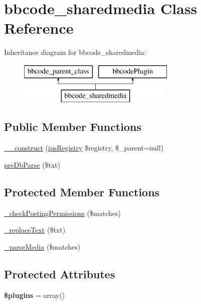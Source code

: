 \hypertarget{classbbcode__sharedmedia}{\section{bbcode\-\_\-sharedmedia Class Reference}
\label{classbbcode__sharedmedia}
}
Inheritance diagram for bbcode\-\_\-sharedmedia\-:\begin{figure}[H]
\begin{center}
\leavevmode
\includegraphics[height=2.000000cm]{classbbcode__sharedmedia}
\end{center}
\end{figure}
\subsection*{Public Member Functions}
\begin{DoxyCompactItemize}
\item 
\hyperlink{classbbcode__sharedmedia_a9c7a683aed4631ab88876012e950f1ab}{\-\_\-\-\_\-construct} (\hyperlink{classips_registry}{ips\-Registry} \$registry, \$\-\_\-parent=null)
\item 
\hyperlink{classbbcode__sharedmedia_a761782abec1999eac70cda803a5e0e32}{pre\-Db\-Parse} (\$txt)
\end{DoxyCompactItemize}
\subsection*{Protected Member Functions}
\begin{DoxyCompactItemize}
\item 
\hyperlink{classbbcode__sharedmedia_a5faf66ad7cadae84b2e772b6b07c883d}{\-\_\-check\-Posting\-Permissions} (\$matches)
\item 
\hyperlink{classbbcode__sharedmedia_a5001c42193db0c30308d9a3f17ccd950}{\-\_\-replace\-Text} (\$txt)
\item 
\hyperlink{classbbcode__sharedmedia_a561f790f0b1a5df646df9a3916215711}{\-\_\-parse\-Media} (\$matches)
\end{DoxyCompactItemize}
\subsection*{Protected Attributes}
\begin{DoxyCompactItemize}
\item 
\hypertarget{classbbcode__sharedmedia_a4ab51386acb82cd0a0066eac2567b2bd}{{\bfseries \$plugins} = array()}\label{classbbcode__sharedmedia_a4ab51386acb82cd0a0066eac2567b2bd}

\end{DoxyCompactItemize}
